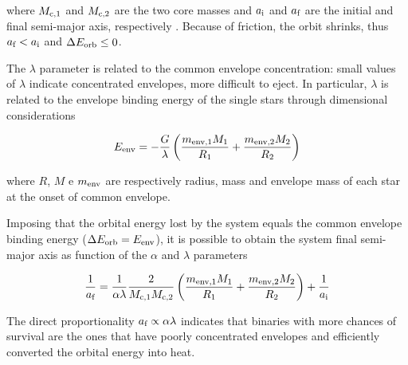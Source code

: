 \documentclass[a4paper,titlepage]{book}     	%
\begin{document}
where $M_\textup{c,1}$ and $M_\textup{c,2}$ are the two core masses and $a_\textup{i}$ and $a_\textup{f}$ are the initial and final semi-major axis, respectively . Because of friction, the orbit shrinks, thus $a_\textup{f} < a_\textup{i}$ and $\Delta E_\textup{orb} \leq 0$.

The $\lambda$ parameter is related to the common envelope concentration: small values of $\lambda$ indicate concentrated envelopes, more difficult to eject. In particular, $\lambda$ is related to the envelope binding energy of the single stars through dimensional considerations

\begin{equation}\label{eq:EenvCElambda}
E_\textup{env} = - \frac{G}{\lambda} \left(\frac{m_\textup{env,1} M_1}{R_1}+ \frac{m_\textup{env,2} M_2}{R_2}\right)
\end{equation}

where $R$, $M$ e $m_\textup{env}$ are respectively radius, mass and envelope mass of each star at the onset of common envelope.

Imposing that the orbital energy lost by the system equals the common envelope binding energy ($\Delta E_\textup{orb} = E_\textup{env}$), it is possible to obtain the system final semi-major axis as function of the $\alpha$ and $\lambda$ parameters

\begin{equation}\label{eqn:a_ce}
\frac{1}{a_\textup{f}} = \frac{1}{\alpha \lambda} \frac{2}{M_\textup{c,1} M_\textup{c,2}} \left(\frac{m_\textup{env,1} M_1}{R_1}+ \frac{m_\textup{env,2} M_2}{R_2}\right) + \frac{1}{a_\textup{i}}
\end{equation}

The direct proportionality $a_\textup{f} \propto \alpha\lambda$ indicates that binaries with more chances of survival are the ones that have poorly concentrated envelopes and efficiently converted the orbital energy into heat. \\
\end{document}
